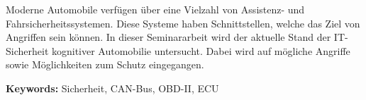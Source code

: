 Moderne Automobile verfügen über eine Vielzahl von Assistenz- und
Fahrsicherheitssystemen. Diese Systeme haben Schnittstellen, welche das Ziel
von Angriffen sein können. In dieser Seminararbeit wird der aktuelle Stand der
IT-Sicherheit kognitiver Automobilie untersucht. Dabei wird auf mögliche
Angriffe sowie Möglichkeiten zum Schutz eingegangen.

\textbf{Keywords:} Sicherheit, CAN-Bus, OBD-II, ECU
